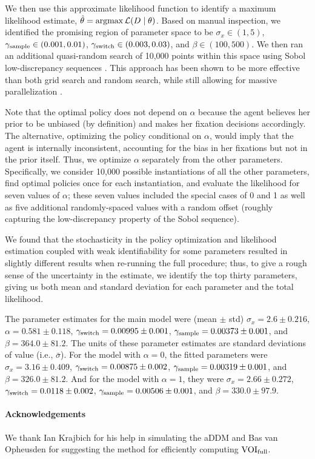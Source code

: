 We then use this approximate likelihood function to identify a maximum likelihood estimate, $\hat{\theta}=\operatorname*{argmax} \mathcal{L}(D \mid \theta)$. Based on manual inspection, we identified the promising region of parameter space to be $\sigma_{x}\in(1,5)$, $\gamma_\text{sample}\in(0.001,0.01)$, $\gamma_\text{switch}\in(0.003,0.03)$, and $\beta\in(100,500)$.
We then ran an additional quasi-random search of 10,000 points within this space using Sobol low-discrepancy sequences \citep{sobol1967distribution}. This approach has been shown to be more effective than both grid search and random search, while still allowing for massive parallelization \citep{bergstra2012random}. 

Note that the optimal policy does not depend on $\alpha$ because the agent believes her prior to be unbiased (by definition) and makes her fixation decisions accordingly.
The alternative, optimizing the policy conditional on $\alpha$, would imply that the agent is internally inconsistent, accounting for the bias in her fixations but not in the prior itself.
Thus, we optimize $\alpha$ separately from the other parameters.
Specifically, we consider 10,000 possible instantiations of all the other parameters, find optimal policies once for each instantiation, and evaluate the likelihood for seven values of $\alpha$; these seven values included the special cases of 0 and 1 as well as five additional randomly-spaced values with a random offset (roughly capturing the low-discrepancy property of the Sobol sequence).

We found that the stochasticity in the policy optimization and likelihood estimation coupled with weak identifiability for some parameters resulted in slightly different results when re-running the full procedure; thus, to give a rough sense of the uncertainty in the estimate, we identify the top thirty parameters, giving us both mean and standard deviation for each parameter and the total likelihood.

The parameter estimates for the main model were (mean $\pm$ std)
$\sigma_x = 2.6 \pm 0.216$,
$\alpha = 0.581 \pm 0.118$,
$\gamma_\text{switch} =  0.00995 \pm 0.001$,
$\gamma_\text{sample} = 0.00373 \pm 0.001$, and
$\beta = 364.0 \pm 81.2$.
The units of these parameter estimates are standard deviations of value (i.e., $\bar{\sigma}$). 
%
For the model with $\alpha = 0$, the fitted parameters were
$\sigma_x = 3.16 \pm 0.409$,
$\gamma_\text{switch} =  0.00875 \pm 0.002$,
$\gamma_\text{sample} = 0.00319 \pm 0.001$, and
$\beta = 326.0 \pm 81.2$.
%
And for the model with $\alpha = 1$, they were
$\sigma_x = 2.66 \pm 0.272$,
$\gamma_\text{switch} =   0.0118 \pm 0.002$,
$\gamma_\text{sample} = 0.00506 \pm 0.001$, and
$\beta = 330.0 \pm 97.9$.


\paragraph{Acknowledgements}
We thank Ian Krajbich for his help in simulating the aDDM and Bas van Opheusden for suggesting the method for efficiently computing $\text{VOI}_\text{full}$.

